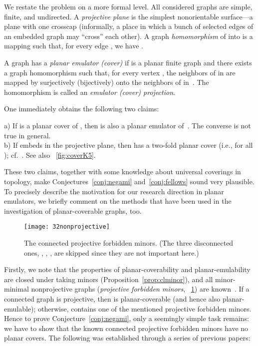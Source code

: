 \documentclass[envcountsect,envcountsame]{llncs}
\begin{document}
We restate the problem on a more formal level.
All considered graphs are simple, finite, and undirected.
A {\em projective plane} is the simplest nonorientable surface---a plane
with one crosscap (informally, a place in which a bunch of selected edges 
of an embedded  graph may ``cross'' each other).
A graph {\em homomorphism} of  into  is a mapping
 such that, for every edge ,
we have .

\begin{definition}\label{def:emulator}
A graph  has a {\em planar emulator (cover)}  if  is a planar finite graph 
and there exists a graph homomorphism  such that,
for every vertex , the neighbors of  in  are mapped by
 surjectively (bijectively) onto the neighbors of  in~.
The homomorphism  is called an {\em emulator (cover) projection}.
\end{definition}
\noindent
One immediately obtains the following two claims:

\begin{lemma}\label{lem:2fold}
a) If  is a planar cover of , then  is also a planar emulator of~.
The converse is not true in general.
\\
b) If  embeds in the projective plane, then  has a two-fold planar cover 
(i.e.,  for all ); cf.~\cite{cit:double}.
See also \figurename~\ref{fig:coverK5}.
\end{lemma}
These two claims, together with some knowledge about universal coverings in topology, 
make Conjectures~\ref{conj:negami} and~\ref{conj:fellows} sound very plausible.
To precisely describe the motivation for our research direction in planar emulators, 
we briefly comment on the methods that have been used in the investigation
of planar-coverable graphs, too.

\begin{figure}[tb]
\centering
\texttt{[image: 32nonprojective]}
\caption{The  connected projective forbidden minors. (The three
disconnected ones, , , ,
are skipped since they are not important here.)}
\label{fig:32nonproj}
\end{figure}

Firstly, we note that the properties of planar-coverability and planar-emula\-bility
are closed under taking minors (Proposition~\ref{prop:clminor}), 
and all  minor-minimal nonprojective graphs ({\em projective forbidden minors},
\figurename~\ref{fig:32nonproj}) are known~\cite{cit:archd-pp}.
If a connected graph  is projective, then  is planar-coverable (and 
hence also planar-emulable); otherwise,  contains one of the mentioned 
projective forbidden minors. 
Hence to prove Conjecture~\ref{conj:negami}, only a seemingly simple task
remains: we have to show that the known  connected projective forbidden
minors have no planar covers.
The following was established through a series of previous papers:
\end{document}
